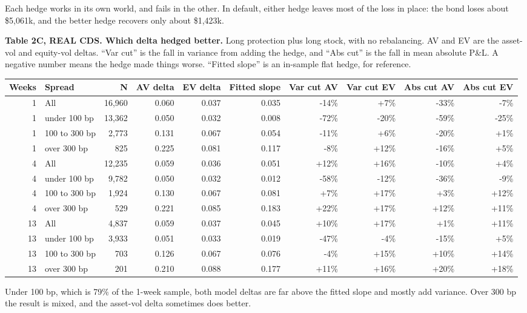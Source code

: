 \documentclass[10pt,a4paper]{article}
\begin{document}
Each hedge works in its own world, and fails in the other. In default, either hedge leaves most of the loss in place: the bond loses about \$5,061k, and the better hedge recovers only about \$1,423k.

\textbf{Table 2C, REAL CDS. Which delta hedged better.} Long protection plus long stock, with no rebalancing. AV and EV are the asset-vol and equity-vol deltas. ``Var cut'' is the fall in variance from adding the hedge, and ``Abs cut'' is the fall in mean absolute P\&L. A negative number means the hedge made things worse. ``Fitted slope'' is an in-sample flat hedge, for reference.
{\footnotesize
\begin{center}\begin{tabular}{rlrrrrrrrr}\toprule
Weeks & Spread & N & AV delta & EV delta & Fitted slope & Var cut AV & Var cut EV & Abs cut AV & Abs cut EV \\ \midrule
1 & All & 16,960 & 0.060 & 0.037 & 0.035 & -14\% & +7\% & -33\% & -7\% \\
1 & under 100 bp & 13,362 & 0.050 & 0.032 & 0.008 & -72\% & -20\% & -59\% & -25\% \\
1 & 100 to 300 bp & 2,773 & 0.131 & 0.067 & 0.054 & -11\% & +6\% & -20\% & +1\% \\
1 & over 300 bp & 825 & 0.225 & 0.081 & 0.117 & -8\% & +12\% & -16\% & +5\% \\
4 & All & 12,235 & 0.059 & 0.036 & 0.051 & +12\% & +16\% & -10\% & +4\% \\
4 & under 100 bp & 9,782 & 0.050 & 0.032 & 0.012 & -58\% & -12\% & -36\% & -9\% \\
4 & 100 to 300 bp & 1,924 & 0.130 & 0.067 & 0.081 & +7\% & +17\% & +3\% & +12\% \\
4 & over 300 bp & 529 & 0.221 & 0.085 & 0.183 & +22\% & +17\% & +12\% & +11\% \\
13 & All & 4,837 & 0.059 & 0.037 & 0.045 & +10\% & +17\% & +1\% & +11\% \\
13 & under 100 bp & 3,933 & 0.051 & 0.033 & 0.019 & -47\% & -4\% & -15\% & +5\% \\
13 & 100 to 300 bp & 703 & 0.126 & 0.067 & 0.076 & -4\% & +15\% & +10\% & +14\% \\
13 & over 300 bp & 201 & 0.210 & 0.088 & 0.177 & +11\% & +16\% & +20\% & +18\% \\
\bottomrule\end{tabular}\end{center}}

Under 100 bp, which is 79\% of the 1-week sample, both model deltas are far above the fitted slope and mostly add variance. Over 300 bp the result is mixed, and the asset-vol delta sometimes does better.
\end{document}
